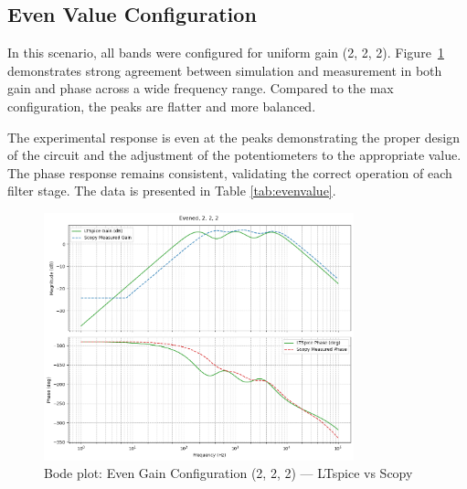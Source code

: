 \documentclass[12pt]{article}
\begin{document}
\subsection{Even Value Configuration}

In this scenario, all bands were configured for uniform gain (2, 2, 2). Figure~\ref{fig:evenvalue} demonstrates strong agreement between simulation and measurement in both gain and phase across a wide frequency range. Compared to the max configuration, the peaks are flatter and more balanced.

The experimental response is even at the peaks demonstrating the proper design of the circuit and the adjustment of the potentiometers to the appropriate value. The phase response remains consistent, validating the correct operation of each filter stage. The data is presented in Table \ref{tab:evenvalue}.

\begin{figure}[H]
	\centering
	\includegraphics[width=0.8\textwidth]{dp2even.png}
	\caption{Bode plot: Even Gain Configuration (2, 2, 2) — LTspice vs Scopy}
	\label{fig:evenvalue}
\end{figure}
\end{document}
